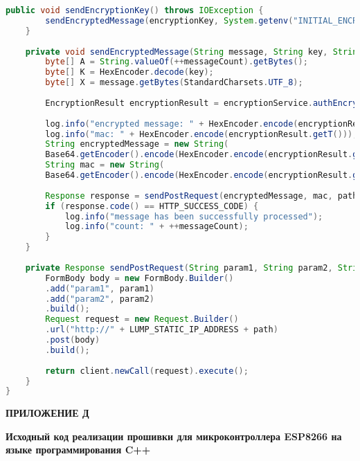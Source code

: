 \begin{lstlisting}[language=Java,label=client-code]
	public void sendEncryptionKey() throws IOException {
		sendEncryptedMessage(encryptionKey, System.getenv("INITIAL_ENCRYPTION_KEY"), KEY_PATH);
	}
	
	private void sendEncryptedMessage(String message, String key, String path) throws IOException {
		byte[] A = String.valueOf(++messageCount).getBytes();
		byte[] K = HexEncoder.decode(key);
		byte[] X = message.getBytes(StandardCharsets.UTF_8);
		
		EncryptionResult encryptionResult = encryptionService.authEncrypt(A, K, X);
		
		log.info("encrypted message: " + HexEncoder.encode(encryptionResult.getY()));
		log.info("mac: " + HexEncoder.encode(encryptionResult.getT()));
		String encryptedMessage = new String(
		Base64.getEncoder().encode(HexEncoder.encode(encryptionResult.getY()).getBytes()));
		String mac = new String(
		Base64.getEncoder().encode(HexEncoder.encode(encryptionResult.getT()).getBytes()));
		
		Response response = sendPostRequest(encryptedMessage, mac, path);
		if (response.code() == HTTP_SUCCESS_CODE) {
			log.info("message has been successfully processed");
			log.info("count: " + ++messageCount);
		}
	}
	
	private Response sendPostRequest(String param1, String param2, String path) throws IOException {
		FormBody body = new FormBody.Builder()
		.add("param1", param1)
		.add("param2", param2)
		.build();
		Request request = new Request.Builder()
		.url("http://" + LUMP_STATIC_IP_ADDRESS + path)
		.post(body)
		.build();
		
		return client.newCall(request).execute();
	}
}

\end{lstlisting}


\newpage

\begin{flushright}{\bf \Large ПРИЛОЖЕНИЕ Д}\end{flushright}
\begin{center}
	{\bf Исходный код реализации прошивки для микроконтроллера ESP8266 
		на языке программирования C++}
\end{center}


